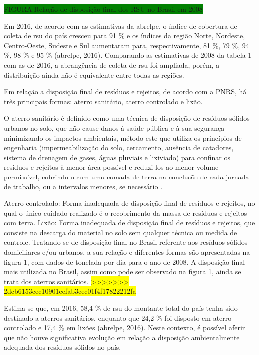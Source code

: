 \colorbox{green}{FIGURA:Relação de disposição final dos RSU no Brasil em 2008}

	Em 2016, de acordo com as estimativas da \gls{abrelpe}, o índice de cobertura de coleta de \gls{rsu} do país cresceu para 91 \% e os índices da região Norte, Nordeste, Centro-Oeste, Sudeste e Sul aumentaram para, respectivamente, 81 \%, 79 \%, 94 \%, 98 \% e 95 \% (\gls{abrelpe}, 2016). Comparando as estimativas de 2008 da tabela 1 com as de 2016, a abrangência de coleta de \gls{rsu} foi ampliada, porém, a distribuição ainda não é equivalente entre todas as regiões.
	
	Em relação a disposição final de resíduos e rejeitos, de acordo com a PNRS, há três principais formas: aterro sanitário, aterro controlado e lixão.
	
	O aterro sanitário é definido como uma técnica de disposição de resíduos sólidos urbanos no solo, que não cause danos à saúde pública e à sua segurança minimizando os impactos ambientais, método este que utiliza os princípios de engenharia (impermeabilização do solo, cercamento, ausência de catadores, sistema de	drenagem de gases, águas pluviais e lixiviado) para confinar os resíduos e rejeitos à menor área possível e reduzi-los ao menor volume permissível,	cobrindo-o com uma camada de terra na conclusão de cada jornada de trabalho, ou a intervalos menores, se necessário \cite{PNRS2010}.
	
	Aterro controlado: Forma inadequada de disposição final de resíduos e rejeitos, no qual o único cuidado realizado é o recobrimento da massa
	de resíduos e rejeitos com terra.
	Lixão: Forma inadequada de disposição final de resíduos e rejeitos, que consiste na descarga do material no solo sem qualquer técnica ou
	medida de controle.
	Tratando-se de disposição final no Brasil referente aos resíduos sólidos domiciliares e/ou urbanos, a sua relação e diferentes formas são apresentadas na figura 1, com dados de tonelada por dia para o ano de 2008. A disposição final mais utilizada no Brasil, assim como pode ser observado na figura 1, ainda se trata dos aterros sanitários. 
\colorbox{yellow}{>>>>>>> 2dcb6153cec10901eefab3cec01f4f17822212fa}
	
	Estima-se que, em 2016, 58,4 \% de \gls{rsu} do montante total do país tenha sido destinado a aterros sanitários, enquanto que 24,2 \% foi disposto em aterro controlado e 17,4 \% em lixões (\gls{abrelpe}, 2016). Neste contexto, é possível aferir que não houve significativa evolução em relação a disposição ambientalmente adequada dos resíduos sólidos no país.
	
